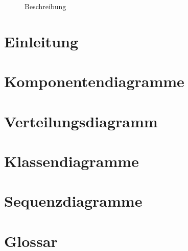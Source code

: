 \documentclass{report}
\begin{document}

	\begin{figure}[h]
		\centering
		\caption{Beschreibung}
		\label{fig:x}
	\end{figure}


	\tableofcontents

	\chapter{Einleitung}\label{chp:einleitung}
	\thispagestyle{fancy}
	

	\chapter{Komponentendiagramme}\label{chp:komponentendiagramme}
	\thispagestyle{fancy}
	

	\chapter{Verteilungsdiagramm}\label{chp:verteilungsdiagramm}
	\thispagestyle{fancy}
	

	\chapter{Klassendiagramme}\label{chp:klassendiagramme}
	\thispagestyle{fancy}
	

	\chapter{Sequenzdiagramme}\label{chp:sequenzdiagramme}
	\thispagestyle{fancy}
	

	\chapter{Glossar}\label{chp:glossar}
	\thispagestyle{fancy}
	

	
\end{document}
